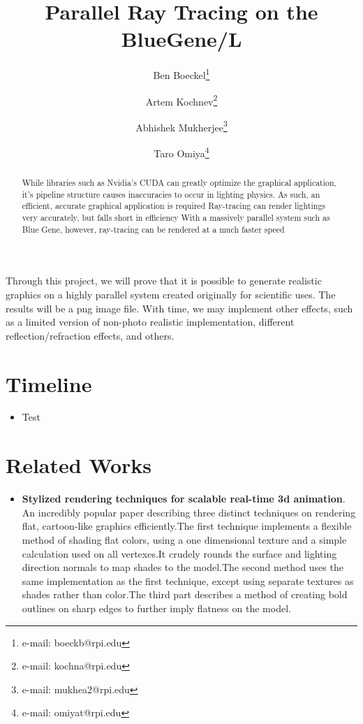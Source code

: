 \documentclass{acmsiggraph}
\title{Parallel Ray Tracing on the BlueGene/L}
\author{%
Ben Boeckel\thanks{e-mail: boeckb@rpi.edu} %
\and Artem Kochnev\thanks{e-mail: kochna@rpi.edu} %
\and Abhishek Mukherjee\thanks{e-mail: mukhea2@rpi.edu} %
\and Taro Omiya\thanks{e-mail: omiyat@rpi.edu}}
\begin{document}
\maketitle

\begin{abstract}
While libraries such as Nvidia's CUDA can greatly optimize the graphical
application, it's pipeline structure causes inaccuracies to occur in lighting
physics.  As such, an efficient, accurate graphical application is required
Ray-tracing can render lightings very accurately, but falls short in efficiency
With a massively parallel system such as Blue Gene, however, ray-tracing can be
rendered at a much faster speed
\end{abstract}

\section{}
Through this project, we will prove that it is possible to generate realistic
graphics on a highly parallel system created originally for scientific uses.
The results will be a png image file.  With time, we may implement other
effects, such as a limited version of non-photo realistic implementation,
different reflection/refraction effects, and others.

\keywordlist

\section*{Timeline}
\begin{itemize}
\item Test
\end{itemize}

\section*{Related Works}

\begin{itemize}
\item
\textbf{Stylized rendering techniques for scalable real-time 3d animation}.
An incredibly popular paper describing three distinct techniques on rendering
flat, cartoon-like graphics efficiently.The first technique implements a
flexible method of shading flat colors, using a one dimensional texture and a
simple calculation used on all vertexes.It crudely rounds the surface and
lighting direction normals to map shades to the model.The second method uses
the same implementation as the first technique, except using separate textures
as shades rather than color.The third part describes a method of creating
bold outlines on sharp edges to further imply flatness on the
model.\cite{lake2000srt}
\end{itemize}



\end{document}
